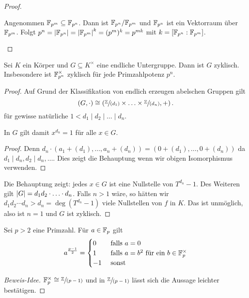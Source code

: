 \begin{proof}
\begin{enumerate}[1)]
			Angenommen $\mathbb{F}_{p^{m}} \subseteq \mathbb{F}_{p^{n}}$. Dann ist $\mathbb{F}_{p^{n}} / \mathbb{F}_{p^{m}}$ und $\mathbb{F}_{p^{n}}$ ist ein Vektorraum über $\mathbb{F}_{p^{m}}$.
			Folgt $p^{n} = \abs{\mathbb{F}_{p^{n}}} = \abs{\mathbb{F}_{p^{m}}}^{k} = (p^{m})^{k} = p^{ m k}$ mit $k = [\mathbb{F}_{p^{n}} : \mathbb{F}_{p^{m}}]$.

	\end{enumerate}
\end{proof}

\begin{theorem}
	Sei $K$ ein Körper und $G \subseteq K^{\times}$ eine endliche Untergruppe.
	Dann ist $G$ zyklisch. Insbesondere ist $\mathbb{F}_{p^{n}}^{\times}$ zyklisch für jede Primzahlpotenz $p^{n}$.
\end{theorem}

\begin{proof}
	Auf Grund der Klassifikation von endlich erzeugen abelschen Gruppen gilt
	\[
		(G,\cdot) \cong \left(\sfrac{\mathbb{Z}}{(d_1)} \times  \ldots \times  \sfrac{\mathbb{Z}}{(d_{n})}, + \right)
	.\] 
	für gewisse natürliche $1 < d_1 \mid d_2 \mid \ldots \mid d_{n}$.
	\begin{claim}
		In $G$ gilt damit $x^{d_{n}} = 1$ für alle $x \in G$.
	\end{claim}
	\begin{proof}
		Denn $d_{n} \cdot (a_1 + (d_1), \ldots, a_{n} + (d_{n})) = (0 + (d_1),\ldots, 0 + (d_{n}))$ da $d_1 \mid d_{n}, d_2 \mid d_{n}, \ldots$.
		Dies zeigt die Behauptung wenn wir obigen Isomorphismus verwenden.
	\end{proof}
	Die Behauptung zeigt: jedes $x \in G$ ist eine Nullstelle von $T^{d_{n}} - 1$.
	Des Weiteren gilt $\abs{G} = d_1 d_2 \cdot \ldots \cdot d_{n}$.
	Falls $n > 1$ wäre, so hätten wir $d_1 d_2 \cdots d_{n} > d_{n} = \deg(T^{d_{n}} - 1)$ viele Nullstellen von $f$ in $K$.
	Das ist unmöglich, also ist $n = 1$ und $G$ ist zyklisch.
\end{proof}

\begin{corollary}
	Sei $p > 2$ eine Primzahl. Für $a \in \mathbb{F}_{p}$ gilt 
	\[
		a^{\frac{p-1}{2}} = \begin{cases}
			0 &\text{ falls } a = 0\\
			1 &\text{ falls } a = b^{2} \text{ für ein } b \in \mathbb{F}_{p}^{\times}\\
			-1 &\text{ sonst }
		\end{cases}
	\]
\end{corollary}

\begin{proof}[Beweis-Idee]
	$\mathbb{F}_{p}^{\times} \cong \sfrac{\mathbb{Z}}{(p-1)}$ und in $\sfrac{\mathbb{Z}}{(p-1)}$ lässt sich die Aussage leichter bestätigen.
\end{proof}


































 
